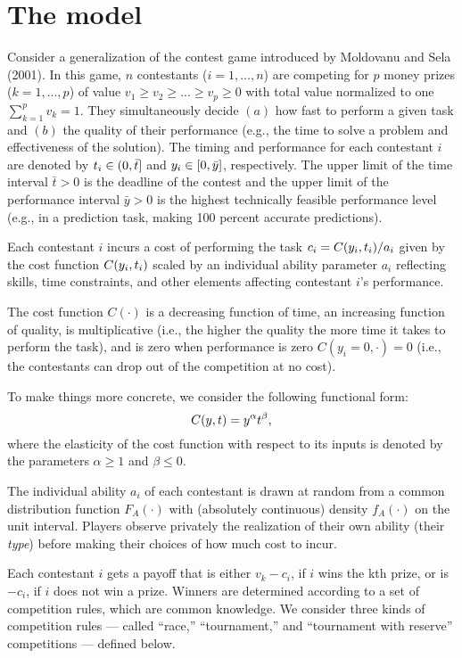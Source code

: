 \documentclass[10pt, titlepage]{article}
\newcommand\deadline{\bar{t}}
\begin{document}
\section{The model}\label{the-model}

Consider a generalization of the contest game introduced by Moldovanu
and Sela (2001). In this game, \(n\) contestants (\(i=1,..., n\)) are
competing for \(p\) money prizes (\(k=1,...,p\)) of value
\(v_1\geq v_2\geq ...\geq v_p\geq0\) with total value normalized to one
\(\sum_{k=1}^p v_k =1\). They simultaneously decide \((a)\) how fast to
perform a given task and \((b)\) the quality of their performance (e.g.,
the time to solve a problem and effectiveness of the solution). The
timing and performance for each contestant \(i\) are denoted by
\(\timing_i\in(0,\deadline]\) and \(y_i\in[0,\bar y]\),
respectively. The upper limit of the time interval \(\deadline>0\) is
the deadline of the contest and the upper limit of the performance
interval \(\bar y>0\) is the highest technically feasible performance
level (e.g., in a prediction task, making 100 percent accurate
predictions).

Each contestant \(i\) incurs a cost of performing the task
\(c_i = C(y_i, t_i) / a_i\) given by the cost
function \(C(y_i, t_i)\) scaled by an individual
ability parameter \(a_i\) reflecting skills, time constraints, and other
elements affecting contestant \(i\)'s performance.

The cost function \(C(\cdot)\) is a decreasing function of time, an
increasing function of quality, is multiplicative (i.e., the higher the
quality the more time it takes to perform the task), and is zero when
performance is zero \(C(y_i=0, \cdot)=0\) (i.e., the contestants can
drop out of the competition at no cost).

To make things more concrete, we consider the following functional form:
\[
    C(y, t) = y^\alpha t^\beta,
\] where the elasticity of the cost function with respect to its inputs
is denoted by the parameters \(\alpha\geq1\) and \(\beta\leq0\).

The individual ability \(a_i\) of each contestant is drawn at random
from a common distribution function \(F_A(\cdot)\) with (absolutely
continuous) density \(f_A(\cdot)\) on the unit interval. Players observe
privately the realization of their own ability (their \emph{type})
before making their choices of how much cost to incur.

Each contestant \(i\) gets a payoff that is either \(v_k - c_i\), if
\(i\) wins the kth prize, or is \(-c_i\), if \(i\) does not win a prize.
Winners are determined according to a set of competition rules, which
are common knowledge. We consider three kinds of competition rules ---
called ``race,'' ``tournament,'' and ``tournament with reserve''
competitions --- defined below.
\end{document}
